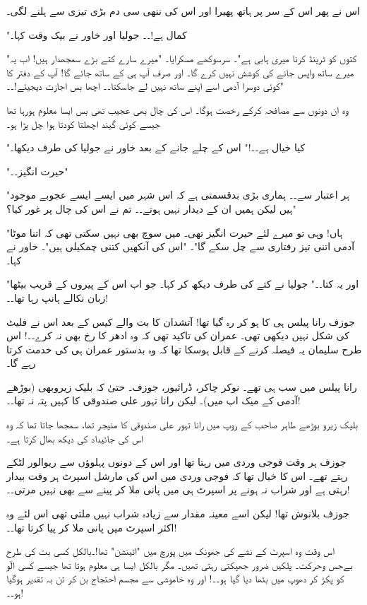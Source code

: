 اس نے پھر اس کے سر پر ہاتھ پھیرا اور اس کی ننھی سی دم بڑی تیزی سے ہلنے لگی۔

"کمال ہے!۔۔ جولیا اور خاور نے بیک وقت کہا۔

"کتوں کو ٹرینڈ کرنا میری ہابی ہے"۔ سرسوکھے مسکرایا۔ "میرے سارے کتے بڑے سمجھدار ہیں! اب یہ میرے ساتھ واپس جانے کی کوشش نہیں کرے گا۔ اور صرف آپ ہی کے ساتھ جائے گا! آپ کے دفتر کا کوئی دوسرا آدمی اسے اپنے ساتھ نہیں لے جاسکتا۔۔ اچھا بس اجازت دیجیئے!۔۔"

وہ ان دونوں سے مصافحہ کرکے رخصت ہوگا۔ اس کی چال بھی عجیب تھی بس ایسا معلوم ہورہا تھا جیسے کوئی گیند اچھلتا کودتا ہوا چل پڑا ہو۔

"کیا خیال ہے۔۔!" اس کے چلے جانے کے بعد خاور نے جولیا کی طرف دیکھا۔

"حیرت انگیز۔۔"

"ہر اعتبار سے۔۔ ہماری بڑی بدقسمتی ہے کہ اس شہر میں ایسے ایسے عجوبے موجود ہیں لیکن ہمیں ان کے دیدار نہیں ہوتے۔۔ تم نے اس کی چال پر غور کیا؟"

"ہاں! وہی تو میرے لئے حیرت انگیز تھی۔ میں سوچ بھی نہیں سکتی تھی کہ اتنا موٹا آدمی اتنی تیز رفتاری سے چل سکے گا"۔
"اس کی آنکھیں کتنی چمکیلی ہیں"۔ خاور نے کہا۔

"اور یہ کتا۔۔" جولیا نے کتے کی طرف دیکھ کر کہا۔ جو اب اس کے پیروں کے قریب بیٹھا زبان نکالے ہانپ رہا تھا۔۔!

\endR
\bigskip\bigskip\bigskip

\centerline{}
\bigskip\bigskip\bigskip
\beginR
\body

جوزف رانا پیلس ہی کا ہو کر رہ گیا تھا! آتشدان کا بت والے کیس کے بعد اس نے فلیٹ کی شکل نہیں دیکھی تھی۔ عمران کی تاکید تھی کہ وہ ادھر کا رخ بھی نہ کرے۔۔! اس طرح سلیمان یہ فیصلہ کرنے کے قابل ہوسکا تھا کہ وہ بدستور عمران ہی کی خدمت کرتا رہے گا۔

رانا پیلس میں سب ہی تھے۔ نوکر چاکر، ڈرائیور، جوزف۔ حتیٰ کہ بلیک زیروبھی (بوڑھے آدمی کے میک اپ میں)۔ لیکن رانا تہور علی صندوقی کا کہیں پتہ نہ تھا۔۔!

بلیک زیرو بوڑھے طاہر صاحب کے روپ میں رانا تہور علی صندوقی کا منیجر تھا، سمجھا جاتا تھا کہ وہ اس کی جائیداد کی دیکھ بھال کرتا ہے۔

جوزف ہر وقت فوجی وردی میں رہتا تھا اور اس کے دونوں پہلوؤں سے ریوالور لٹکے رہتے تھے۔ اس کا خیال تھا کہ فوجی وردی میں اس کی مارشل اسپرٹ ہر وقت بیدار رہتی ہے اور شراب نہ ہونے پر اسپرٹ ہی میں پانی ملا کر پینے سے بھی نہیں مرتی۔۔!

جوزف بلانوش تھا! لیکن اسے معینہ مقدار سے زیادہ شراب نہیں ملتی تھی اس لئے وہ اکثر اسپرٹ میں پانی ملا کر پیا کرتا تھا۔۔!

اس وقت وہ اسپرٹ کے نشے کی جھونک میں پورچ میں "اٹینشن" تھا!۔بالکل کسی بت کی طرح بےحس وحرکت۔ پلکیں ضرور جھپکتی رہتی تھیں۔ مگر بالکل ایسا ہی معلوم ہوتا تھا جیسے کسی الّو کو پکڑ کر دھوپ میں بٹھا دیا گیا ہو۔۔! اور وہ خاموشی سے مجسم احتجاج بن کر تن بہ تقدیر ہوگیا ہو۔۔!


